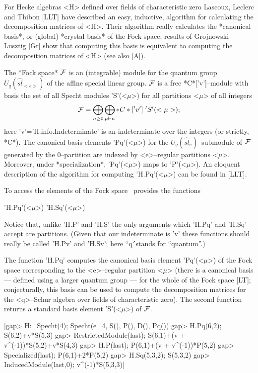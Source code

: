 
For Hecke algebras <H> defined over fields of characteristic zero Lascoux,
Leclerc and Thibon [LLT] have described an easy, inductive, algorithm for 
calculating the decomposition matrices of <H>. Their algorithm really
calculates the *canonical basis*, or (global) *crystal basis* of the
Fock space; results of Grojnowski--Lusztig [Gr] show that computing this 
basis is equivalent to computing the decomposition matrices of <H> (see 
also [A]). 

The *Fock space* ${\cal F}$ is an (integrable) module for the quantum group
$U_q(\widehat{sl}_{<e>})$ of the affine special linear group. ${\cal F}$ is a
free *C*['v']--module with basis the set of all Specht modules
'S'(<$\mu$>) for all partitions <$\mu$> of all integers
$$ \F = \bigoplus_{n\ge0}\bigoplus_{\mu\vdash n}*C*['v']\ 'S'(<\mu>); $$
here 'v'='H.info.Indeterminate' is an indeterminate over the integers 
(or strictly, *C*). The canonical basis elements 'Pq'(<$\mu$>) for the 
$U_q(\widehat{sl}_e)$--submodule of ${\cal F}$ generated by the $0$--partition 
are indexed by <e>--regular partitions <$\mu$>. Moreover, under
*specialization*, 'Pq'(<$\mu$>) maps to 'P'(<$\mu$>). An eloquent 
description of the algorithm for computing 'H.Pq'(<$\mu$>) can be found 
in [LLT].

To access the elements of the Fock space \Specht\ provides the functions\:

'H.Pq'(<$\mu$>)  \qquad  'H.Sq'(<$\mu$>)

Notice that, unlike 'H.P' and 'H.S' the only arguments which 'H.Pq' and 
'H.Sq' accept are partitions. (Given that our indeterminate is 'v' these 
functions should really be called 'H.Pv' and 'H.Sv'; here ``q\'\'\ stands 
for ``quantum''.)

The function 'H.Pq'  computes the canonical basis element 'Pq'(<$\mu$>) 
of the Fock space corresponding to the <e>--regular partition <$\mu$>
(there is a canonical basis --- defined using a larger quantum group ---
for the whole of the Fock space [LT]; conjecturally, this basis can be used 
to compute the decomposition matrices for the <q>--Schur algebra over fields 
of characteristic zero). The second function returns a standard basis 
element 'S'(<$\mu$>) of ${\cal F}$.

|gap> H:=Specht(4);
Specht(e=4, S(), P(), D(), Pq())
gap> H.Pq(6,2); 
S(6,2)+v*S(5,3)
gap> RestrictedModule(last);
S(6,1)+(v + v^(-1))*S(5,2)+v*S(4,3)
gap> H.P(last);
P(6,1)+(v + v^(-1))*P(5,2)
gap> Specialized(last);
P(6,1)+2*P(5,2)
gap> H.Sq(5,3,2);
S(5,3,2)
gap> InducedModule(last,0);
v^(-1)*S(5,3,3)|

